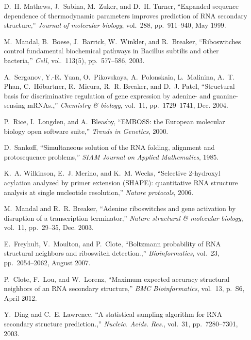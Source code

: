 \documentclass[11pt, oneside]{Thesis} %
\begin{document}
\begin{thebibliography}{100}
D.~H. Mathews, J.~Sabina, M.~Zuker, and D.~H. Turner, ``{Expanded sequence
  dependence of thermodynamic parameters improves prediction of RNA secondary
  structure},'' {\em Journal of molecular biology}, vol.~288, pp.~911--940, May
  1999.

M.~Mandal, B.~Boese, J.~Barrick, W.~Winkler, and R.~Breaker, ``Riboswitches
  control fundamental biochemical pathways in {B}acillus subtilis and other
  bacteria,'' {\em Cell}, vol.~113(5), pp.~577--586, 2003.

A.~Serganov, Y.-R. Yuan, O.~Pikovskaya, A.~Polonskaia, L.~Malinina, A.~T. Phan,
  C.~H{\"o}bartner, R.~Micura, R.~R. Breaker, and D.~J. Patel, ``{Structural
  basis for discriminative regulation of gene expression by adenine- and
  guanine-sensing mRNAs.},'' {\em Chemistry \& biology}, vol.~11,
  pp.~1729--1741, Dec. 2004.

P.~Rice, I.~Longden, and A.~Bleasby, ``{EMBOSS: the European molecular biology
  open software suite},'' {\em Trends in Genetics}, 2000.

D.~Sankoff, ``{Simultaneous solution of the RNA folding, alignment and
  protosequence problems},'' {\em SIAM Journal on Applied Mathematics}, 1985.

K.~A. Wilkinson, E.~J. Merino, and K.~M. Weeks, ``{Selective
  2{\textasciiacute}-hydroxyl acylation analyzed by primer extension (SHAPE):
  quantitative RNA structure analysis at single nucleotide resolution},'' {\em
  Nature protocols}, 2006.

M.~Mandal and R.~R. Breaker, ``{Adenine riboswitches and gene activation by
  disruption of a transcription terminator},'' {\em Nature structural \&
  molecular biology}, vol.~11, pp.~29--35, Dec. 2003.

E.~Freyhult, V.~Moulton, and P.~Clote, ``Boltzmann probability of {RNA}
  structural neighbors and riboswitch detection.,'' {\em Bioinformatics},
  vol.~23, pp.~2054--2062, August 2007.

P.~Clote, F.~Lou, and W.~Lorenz, ``Maximum expected accuracy structural
  neighbors of an {RNA} secondary structure,'' {\em BMC Bioinformatics},
  vol.~13, p.~S6, April 2012.

Y.~Ding and C.~E. Lawrence, ``A statistical sampling algorithm for {RNA}
  secondary structure prediction.,'' {\em Nucleic. Acids. Res.}, vol.~31,
  pp.~7280--7301, 2003.


\end{thebibliography}
\end{document}

